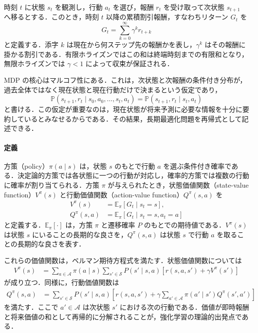 時刻 $t$ に状態 $s_t$ を観測し，行動 $a_t$ を選び，報酬 $r_t$ を受け取って次状態 $s_{t+1}$ へ移るとする．このとき，時刻 $t$ 以降の累積割引報酬，すなわちリターン $G_t$ を
\begin{equation}
G_t = \sum_{k=0}^{\infty} \gamma^k r_{t+k}
\end{equation}
と定義する．添字 $k$ は現在から何ステップ先の報酬かを表し，$\gamma^k$ はその報酬に掛かる割引である．有限ホライズンではこの和は終端時刻までの有限和となり，無限ホライズンでは $\gamma < 1$ によって収束が保証される．

MDP の核心はマルコフ性にある．これは，次状態と次報酬の条件付き分布が，過去全体ではなく現在状態と現在行動だけで決まるという仮定であり，
\begin{equation}
\mathbb{P}(s_{t+1},r_t \mid s_0,a_0,\ldots,s_t,a_t)
=
\mathbb{P}(s_{t+1},r_t \mid s_t,a_t)
\end{equation}
と書ける．この仮定が重要なのは，現在状態が将来予測に必要な情報を十分に要約しているとみなせるからである．その結果，長期最適化問題を再帰式として記述できる．

\paragraph*{定義}
方策（policy）$\pi(a \mid s)$ は，状態 $s$ のもとで行動 $a$ を選ぶ条件付き確率である．決定論的方策では各状態に一つの行動が対応し，確率的方策では複数の行動に確率が割り当てられる．方策 $\pi$ が与えられたとき，状態価値関数（state-value function）$V^\pi(s)$ と行動価値関数（action-value function）$Q^\pi(s,a)$ を
\begin{align}
V^\pi(s) &= \mathbb{E}_\pi[G_t \mid s_t=s], \\
Q^\pi(s,a) &= \mathbb{E}_\pi[G_t \mid s_t=s, a_t=a]
\end{align}
と定義する．$\mathbb{E}_\pi[\cdot]$ は，方策 $\pi$ と遷移確率 $P$ のもとでの期待値である．$V^\pi(s)$ は状態 $s$ にいることの長期的な良さを，$Q^\pi(s,a)$ は状態 $s$ で行動 $a$ を取ることの長期的な良さを表す．

これらの価値関数は，ベルマン期待方程式を満たす．状態価値関数については
\begin{align}
V^\pi(s)
&=
\sum_{a \in \mathcal{A}} \pi(a \mid s)
\sum_{s' \in \mathcal{S}} P(s' \mid s,a)
\left[
r(s,a,s') + \gamma V^\pi(s')
\right]
\end{align}
が成り立つ．同様に，行動価値関数は
\begin{align}
Q^\pi(s,a)
&=
\sum_{s' \in \mathcal{S}} P(s' \mid s,a)
\left[
r(s,a,s') + \gamma \sum_{a' \in \mathcal{A}} \pi(a' \mid s') Q^\pi(s',a')
\right]
\end{align}
を満たす．ここで $a' \in \mathcal{A}$ は次状態 $s'$ における次の行動である．価値が即時報酬と将来価値の和として再帰的に分解されることが，強化学習の理論的出発点である．

